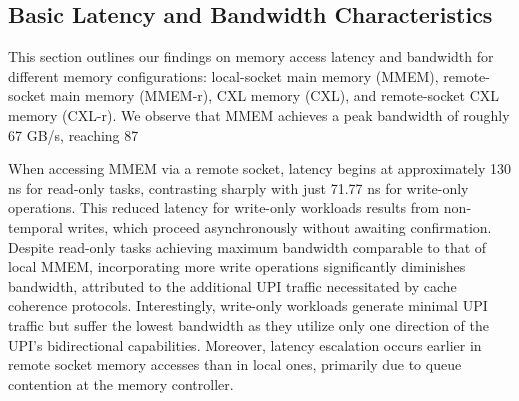 \subsection{Basic Latency and Bandwidth Characteristics} \label{ssec
} This section outlines our findings on memory access latency and bandwidth for different memory configurations: local-socket main memory (MMEM), remote-socket main memory (MMEM-r), CXL memory (CXL), and remote-socket CXL memory (CXL-r). We observe that MMEM achieves a peak bandwidth of roughly 67 GB/s, reaching 87%

When accessing MMEM via a remote socket, latency begins at approximately 130 ns for read-only tasks, contrasting sharply with just 71.77 ns for write-only operations. This reduced latency for write-only workloads results from non-temporal writes, which proceed asynchronously without awaiting confirmation. Despite read-only tasks achieving maximum bandwidth comparable to that of local MMEM, incorporating more write operations significantly diminishes bandwidth, attributed to the additional UPI traffic necessitated by cache coherence protocols. Interestingly, write-only workloads generate minimal UPI traffic but suffer the lowest bandwidth as they utilize only one direction of the UPI's bidirectional capabilities. Moreover, latency escalation occurs earlier in remote socket memory accesses than in local ones, primarily due to queue contention at the memory controller.

